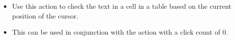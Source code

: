 
\begin{itemize}
\item Use this action to check the text in a cell in a table based on the current position of the cursor.
\item This can be used in conjunction with the action   with a click count of 0.  
\end{itemize}

